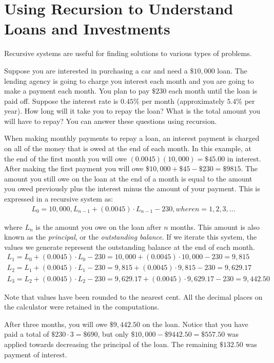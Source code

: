 \documentclass[10pt,]{book}
\theoremstyle{plain}
\theoremstyle{definition}
\theoremstyle{definition}
\theoremstyle{definition}
\numberwithin{equation}{section}
\begin{document}
\section[{Using Recursion to Understand Loans and Investments}]{Using Recursion to Understand Loans and Investments}\label{chapter04-section02}
Recursive systems are useful for finding solutions to various types of problems.%
\par
Suppose you are interested in purchasing a car and need a \(\$10,000\) loan. The lending agency is going to charge you interest each month and you are going to make a payment each month. You plan to pay \(\$230\) each month until the loan is paid off. Suppose the interest rate is \(0.45\%\) per month (approximately \(5.4\%\) per year). How long will it take you to repay the loan? What is the total amount you will have to repay?  You can answer these questions using recursion.%
\par
When making monthly payments to repay a loan, an interest payment is charged on all of the money that is owed at the end of each month.  In this example, at the end of the first month you will owe \((0.0045)(10,000)=\$45.00\) in interest. After making the first payment you will owe \(\$10,000+\$45-\$230=\$9815\). The amount you still owe on the loan at the end of a month is equal to the amount you owed previously plus the interest minus the amount of your payment. This is expressed in a recursive system as:%
%
\begin{gather*}
L_0=10,000, L_{n-1}+(0.0045)\cdot L_{n-1}-230, where n=1,2,3,...
\end{gather*}
\par
where \(L_n\) is the amount you owe on the loan after \(n\) months.  This amount is also known as the \emph{principal}, or the \emph{outstanding balance}. If we iterate this system, the values we generate represent the outstanding balance at the end of each month.%
%
\begin{gather*}
L_1=L_0+(0.0045)\cdot L_0-230=10,000+(0.0045)\cdot 10,000-230=9,815\\
L_2=L_1+(0.0045)\cdot L_1-230=9,815+(0.0045)\cdot 9,815-230=9,629.17\\
L_3=L_2+(0.0045)\cdot L_2-230=9,629.17+(0.0045)\cdot 9,629.17-230=9,442.50
\end{gather*}
\par
Note that values have been rounded to the nearest cent.  All the decimal places on the calculator were retained in the computations.%
\par
After three months, you will owe \(\$9,442.50\) on the loan. Notice that you have paid a total of \(\$230\cdot 3=\$690\), but only \(\$10,000-\$9442.50=\$557.50\) was applied towards decreasing the principal of the loan. The remaining \(\$132.50\) was payment of interest.%
\end{document}
